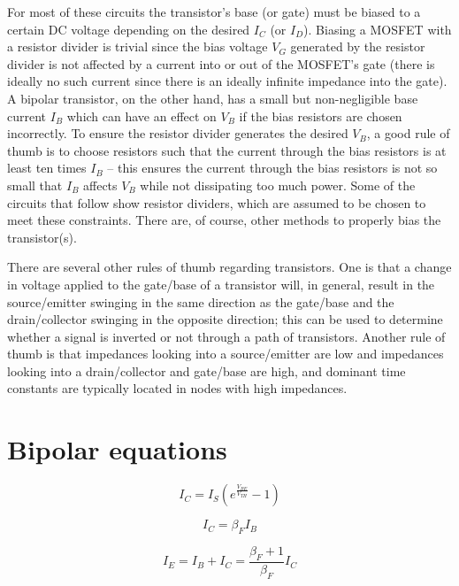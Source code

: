 \par
For most of these circuits the transistor's base (or gate) must be biased to a certain DC voltage depending on the desired $I_{C}$ (or $I_{D}$). Biasing a MOSFET with a resistor divider is trivial since the bias voltage $V_{G}$ generated by the resistor divider is not affected by a current into or out of the MOSFET's gate (there is ideally no such current since there is an ideally infinite impedance into the gate). A bipolar transistor, on the other hand, has a small but non-negligible base current $I_{B}$ which can have an effect on $V_{B}$ if the bias resistors are chosen incorrectly. To ensure the resistor divider generates the desired $V_{B}$, a good rule of thumb is to choose resistors such that the current through the bias resistors is at least ten times $I_{B}$ -- this ensures the current through the bias resistors is not so small that $I_{B}$ affects $V_{B}$ while not dissipating too much power. Some of the circuits that follow show resistor dividers, which are assumed to be chosen to meet these constraints. There are, of course, other methods to properly bias the transistor(s).
\par
There are several other rules of thumb regarding transistors. One is that a change in voltage applied to the gate/base of a transistor will, in general, result in the source/emitter swinging in the same direction as the gate/base and the drain/collector swinging in the opposite direction; this can be used to determine whether a signal is inverted or not through a path of transistors. Another rule of thumb is that impedances looking into a source/emitter are low and impedances looking into a drain/collector and gate/base are high, and dominant time constants are typically located in nodes with high impedances.

\section*{Bipolar equations}
\begin{equation}
I_{C} = I_{S}\left(e^{\frac{V_{BE}}{V_{TH}}}-1\right)
\label{eq:bipolarIc}
\end{equation}

\begin{equation}
I_{C} = \beta_{F}I_{B}
\label{eq:bipolarIcwrtIb}
\end{equation}

\begin{equation}
I_{E} = I_{B} + I_{C} = \frac{\beta_{F}+1}{\beta_{F}}I_{C}
\label{eq:bipolarIewrtIc}
\end{equation}


